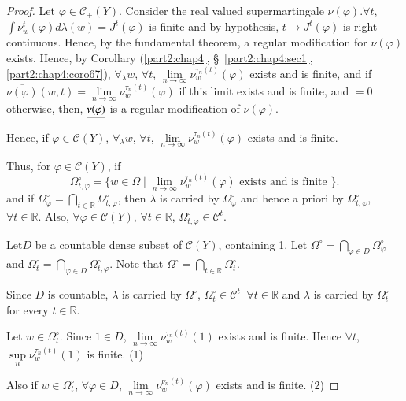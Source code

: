 \begin{proof}
\medskip
{}
Let $\varphi \in \mathscr{C}_+(Y)$. Consider the real valued
supermartingale $\nu(\varphi). \forall t$, $\int\nu^t_w(\varphi)
d\lambda (w) = J^t(\varphi)$ is finite and by hypothesis, $t \to
J^t(\varphi)$ is right continuous. Hence, by the fundamental theorem,
a regular modification for $\nu(\varphi)$ exists. Hence, by Corollary
(\ref{part2:chap4}, \S\ \ref{part2:chap4:sec1},
\ref{part2:chap4:coro67}),  $\forall_\lambda w$, $\forall t$,
$\lim\limits_{n 
  \to \infty} \nu^{\tau_n(t)}_w(\varphi)$ exists and is finite, and if
$\overline{\nu(\varphi)} (w,t) = \lim\limits_{n \to \infty}
\nu^{\tau_n (t)}_w(\varphi)$  if this limit exists and is finite, and
$=0$ otherwise, then, $\underline{\nu(\varphi)}$ is a regular modification of
$\nu(\varphi)$. 

Hence, if $\varphi \in \mathscr{C}(Y)$, $\forall_\lambda w$, $\forall
t$, $\lim\limits_{n \to \infty} \nu^{\tau_n(t)}_w(\varphi)$ exists and
is finite.

Thus, for $\varphi \in \mathscr{C} (Y)$, if 
$$
\Omega^\circ_{t, \varphi} = \{ w\in \Omega \mid \lim\limits_{n \to
  \infty} \nu^{\tau_n(t)}_w(\varphi) \text{ exists and is finite }\}. 
$$
and if $\Omega^\circ_\varphi = \bigcap\limits_{t \in \mathbb{R}}
\Omega^\circ_{t, \varphi}$, then $\lambda$ is carried by
$\Omega^\circ_\varphi$ and hence a priori by $\Omega^\circ_{t,
  \varphi}$, $\forall t \in \mathbb{R}$. Also, $\forall \varphi \in
\mathscr{C} (Y)$, $\forall t \in\mathbb{R}$, $\Omega^\circ_{t,
  \varphi} \in \mathscr{C}^t$. 

Let\pageoriginale $D$ be a countable dense subset of $\mathscr{C}(Y)$,
containing 1. Let $\Omega^\circ = \bigcap\limits_{\varphi \in D}
\Omega^\circ_\varphi$ and $\Omega^\circ_t = \bigcap\limits_{\varphi
  \in D} \Omega^\circ_{t, \varphi}$. Note that $\Omega^\circ =
\bigcap\limits_{t \in \mathbb{R}} \Omega^\circ_t$.

Since $D$ is countable, $\lambda$ is carried by $\Omega^\circ$,
$\Omega^\circ_t \in \mathscr{C}^t \;\; \forall t \in \mathbb{R}$ and
$\lambda$ is carried by $\Omega^\circ_t$ for every $t \in
\mathbb{R}$. 

Let $w \in \Omega^\circ_t$. Since $1 \in D$, $\lim\limits_{n \to
  \infty} \nu^{\tau_n(t)}_w(1)$ exists and is finite. Hence $\forall
t$, $\sup\limits_n \nu^{\tau_n(t)}_w(1)$ is finite. \hfill{(1)}

Also if $w \in\Omega^\circ_t$, $ \forall \varphi \in D$,
$\lim\limits_{n\to\infty} \nu^{\nu_n(t)}_w(\varphi)$ exists and is
finite. \hfill{(2)}


\end{proof}

